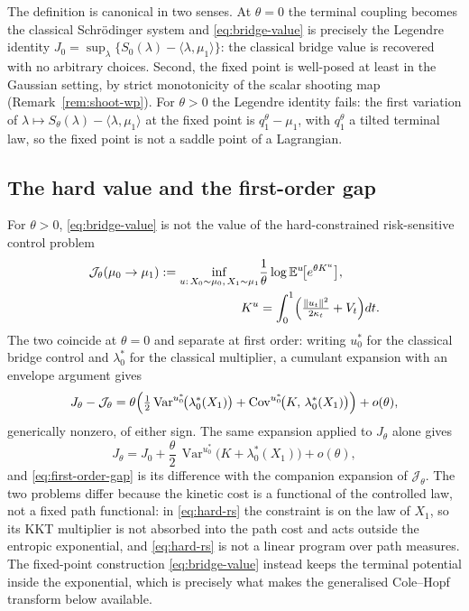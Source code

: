 \documentclass[letterpaper,10pt,conference]{IEEEtran}
\newcommand{\EE}{\mathbb{E}}
\newcommand{\Var}{\operatorname{Var}}
\newcommand{\Cov}{\operatorname{Cov}}
\newcommand{\cJ}{\mathcal{J}}
\begin{document}
	The definition is canonical in two senses. At $\theta=0$ the terminal
	coupling becomes the classical Schr\"odinger system and
	\eqref{eq:bridge-value} is precisely the Legendre identity
	$J_0=\sup_{\lambda}\{S_0(\lambda)-\langle\lambda,\mu_1\rangle\}$: the classical bridge
	value is recovered with no arbitrary choices. Second, the fixed point is
	well-posed at least in the Gaussian setting, by strict monotonicity of the
	scalar shooting map (Remark~\ref{rem:shoot-wp}). For $\theta>0$ the Legendre
	identity fails: the first variation of
	$\lambda\mapsto S_\theta(\lambda)-\langle\lambda,\mu_1\rangle$ at the fixed point is
	$q_1^\theta-\mu_1$, with $q_1^\theta$ a {tilted} terminal law, so the fixed point is not a saddle point of a Lagrangian.
	
	\subsection{The hard value and the first-order gap}
	For $\theta>0$, \eqref{eq:bridge-value} is not the value of the
	hard-constrained risk-sensitive control problem
	\begin{equation}
		\label{eq:hard-rs}
		\begin{split}
			\cJ_\theta(\mu_0\to\mu_1)
			:=\inf_{u:\,X_0\sim\mu_0,\,X_1\sim\mu_1}&\frac1\theta\log
			\EE^{u}\!\bigl[e^{\theta K^u}\bigr],\\
			K^u&=\int_0^1\Bigl(\tfrac{\|u_t\|^2}{2\kappa_t}+V_t\Bigr)dt .
		\end{split}
	\end{equation}
	The two coincide at $\theta=0$ and separate at first order: writing $u_0^*$
	for the classical bridge control and $\lambda_0^*$ for the classical multiplier,
	a cumulant expansion with an envelope argument gives
	\begin{equation}
		\label{eq:first-order-gap}
		J_\theta-\cJ_\theta
		=\theta\Bigl(\tfrac12\Var^{u_0^*}\!\bigl(\lambda_0^*(X_1)\bigr)
		+\Cov^{u_0^*}\!\bigl(K,\,\lambda_0^*(X_1)\bigr)\Bigr)+o(\theta),
	\end{equation}
	generically nonzero, of either sign. The same expansion applied to
	$J_\theta$ alone gives
	\begin{equation}
		\label{eq:first-order-value}
		J_\theta=J_0+\frac{\theta}{2}\,
		\Var^{u_0^*}\!\bigl(K+\lambda_0^*(X_1)\bigr)+o(\theta),
	\end{equation}
	and \eqref{eq:first-order-gap} is its difference with the companion expansion
	of $\cJ_\theta$. The two problems differ because the kinetic cost is a
	functional of the controlled law, not a fixed path functional: in
	\eqref{eq:hard-rs} the constraint is on the law of $X_1$, so its KKT
	multiplier is not absorbed into the path cost and acts outside the entropic
	exponential, and \eqref{eq:hard-rs} is not a linear program over path
	measures. The fixed-point construction \eqref{eq:bridge-value} instead keeps
	the terminal potential inside the exponential, which is precisely what makes
	the generalised Cole--Hopf transform below available.
	
\end{document}
